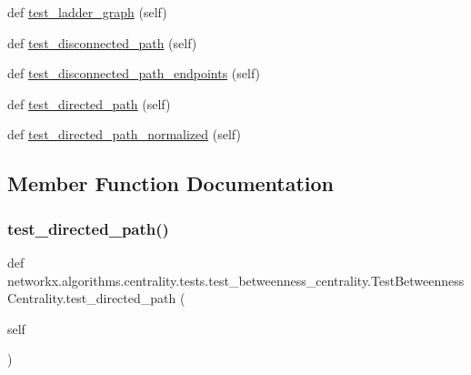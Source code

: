 \begin{DoxyCompactItemize}
def \hyperlink{classnetworkx_1_1algorithms_1_1centrality_1_1tests_1_1test__betweenness__centrality_1_1TestBetweennessCentrality_a6f4aafc7775d662d7b480fc26d19ce9e}{test\+\_\+ladder\+\_\+graph} (self)
\item 
def \hyperlink{classnetworkx_1_1algorithms_1_1centrality_1_1tests_1_1test__betweenness__centrality_1_1TestBetweennessCentrality_adf8b670f923ddb08b17cabf6dd5281c4}{test\+\_\+disconnected\+\_\+path} (self)
\item 
def \hyperlink{classnetworkx_1_1algorithms_1_1centrality_1_1tests_1_1test__betweenness__centrality_1_1TestBetweennessCentrality_ab03232fa690e458a9ad583bc486f62f8}{test\+\_\+disconnected\+\_\+path\+\_\+endpoints} (self)
\item 
def \hyperlink{classnetworkx_1_1algorithms_1_1centrality_1_1tests_1_1test__betweenness__centrality_1_1TestBetweennessCentrality_ad2093d039316ac72f5d8eb7ce2bc5eba}{test\+\_\+directed\+\_\+path} (self)
\item 
def \hyperlink{classnetworkx_1_1algorithms_1_1centrality_1_1tests_1_1test__betweenness__centrality_1_1TestBetweennessCentrality_a8942ce0f0d3a88adc10694cf7659f0a7}{test\+\_\+directed\+\_\+path\+\_\+normalized} (self)
\end{DoxyCompactItemize}


\subsection{Member Function Documentation}
\mbox{\label{classnetworkx_1_1algorithms_1_1centrality_1_1tests_1_1test__betweenness__centrality_1_1TestBetweennessCentrality_ad2093d039316ac72f5d8eb7ce2bc5eba}} 
\subsubsection{\texorpdfstring{test\+\_\+directed\+\_\+path()}{test\_directed\_path()}}
{\footnotesize\ttfamily def networkx.\+algorithms.\+centrality.\+tests.\+test\+\_\+betweenness\+\_\+centrality.\+Test\+Betweenness\+Centrality.\+test\+\_\+directed\+\_\+path (\begin{DoxyParamCaption}\item[{}]{self }\end{DoxyParamCaption})}

